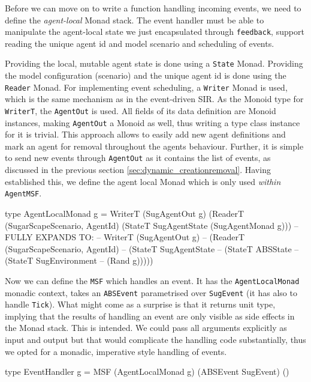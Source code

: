 Before we can move on to write a function handling incoming events, we need to define the \textit{agent-local} Monad stack. The event handler must be able to manipulate the agent-local state we just encapsulated through \texttt{feedback}, support reading the unique agent id and model scenario and scheduling of events.

Providing the local, mutable agent state is done using a \texttt{State} Monad. Providing the model configuration (scenario) and the unique agent id is done using the \texttt{Reader} Monad. For implementing event scheduling, a \texttt{Writer} Monad is used, which is the same mechanism as in the event-driven SIR. As the Monoid type for \texttt{WriterT}, the \texttt{AgentOut} is used. All fields of its data definition are Monoid instances, making \texttt{AgentOut} a Monoid as well, thus writing a type class instance for it is trivial. This approach allows to easily add new agent definitions and mark an agent for removal throughout the agents behaviour. Further, it is simple to send new events through \texttt{AgentOut} as it contains the list of events, as discussed in the previous section \ref{sec:dynamic_creationremoval}. Having established this, we define the agent local Monad which is only used \textit{within} \texttt{AgentMSF}.

\begin{HaskellCode}
type AgentLocalMonad g = WriterT (SugAgentOut g) 
                           (ReaderT (SugarScapeScenario, AgentId) 
                             (StateT SugAgentState (SugAgentMonad g)))     
-- FULLY EXPANDS TO:
-- WriterT (SugAgentOut g) 
--  (ReaderT (SugarScapeScenario, AgentId) 
--    (StateT SugAgentState 
--      (StateT ABSState 
--        (StateT SugEnvironment 
--          (Rand g)))))
\end{HaskellCode}

Now we can define the \texttt{MSF} which handles an event. It has the \texttt{AgentLocalMonad} monadic context, takes an \texttt{ABSEvent} parametrised over \texttt{SugEvent} (it has also to handle \texttt{Tick}). What might come as a surprise is that it returns unit type, implying that the results of handling an event are only visible as side effects in the Monad stack. This is intended. We could pass all arguments explicitly as input and output but that would complicate the handling code substantially, thus we opted for a monadic, imperative style handling of events.

\begin{HaskellCode}
type EventHandler g = MSF (AgentLocalMonad g) (ABSEvent SugEvent) ()
\end{HaskellCode}


